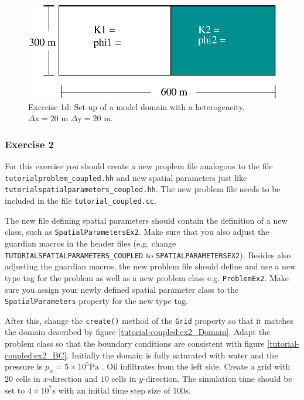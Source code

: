 \begin{enumerate}
\begin{figure}[h]
\centering
\includegraphics[width=0.5\linewidth,keepaspectratio]{EPS/exercise1_c.eps}
\caption{Exercise 1d: Set-up of a model domain with a heterogeneity. $\Delta \text{x} = 20$ m $\Delta \text{y} = 20$ m.}\label{tutorial-coupled:exercise1_d}
\end{figure}

\end{enumerate}

\subsubsection{Exercise 2}
For this exercise you should create a new proplem file analogous to
the file \texttt{tutorialproblem\_coupled.hh} and new spatial parameters 
just like \texttt{tutorialspatialparameters\_coupled.hh}. The new problem file needs to
be included in the file \texttt{tutorial\_coupled.cc}. 

The new file defining spatial parameters should contain the definition 
of a new class, such as \texttt{SpatialParametersEx2}. Make sure that you also adjust the guardian
macros in the header files (e.g. change \texttt{TUTORIALSPATIALPARAMETERS\_COUPLED} to
\texttt{SPATIALPARAMETERSEX2}). Besides also adjusting the guardian macros, 
the new problem file should define and use a new type tag for the problem as well as a new problem class
e.g. \texttt{ProblemEx2}. Make sure you assign your newly defined spatial 
parameter class to the \texttt{SpatialParameters} property for the new 
type tag. 

After this, change the \texttt{create()} method of the \texttt{Grid}
property so that it matches the domain described
by figure \ref{tutorial-coupled:ex2_Domain}. Adapt the problem class
so that the boundary conditions are consistent with figure
\ref{tutorial-coupled:ex2_BC}. Initially the domain is fully saturated
with water and the pressure is $p_w = 5 \times 10^5 \text{Pa}$ . Oil
infiltrates from the left side. Create a grid with $20$ cells in
$x$-direction and $10$ cells in $y$-direction. The simulation time
should be set to $4\times 10^7 \text{s}$ with an initial time step size of
$100 \text{s}$.

